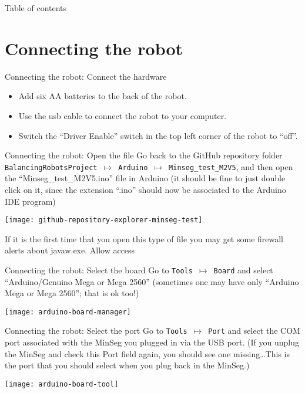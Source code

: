\begin{frame}{Table of contents}
	\tableofcontents
\end{frame}

\section{Connecting the robot}
\begin{frame}{Connecting the robot: Connect the hardware}
	\begin{itemize}
		\item Add six AA batteries to the back of the robot.
		\item Use the usb cable to connect the robot to your computer. 
		\item Switch the ``Driver Enable'' switch in the top left corner of the robot to ``off''.
		\end{itemize}
\end{frame}

\begin{frame}{Connecting the robot: Open the file}
	Go back to the GitHub repository folder \texttt{BalancingRobotsProject $\mapsto$ Arduino $\mapsto$ Minseg\_test\_M2V5}, and then open the ``Minseg\_test\_M2V5.ino'' file in Arduino (it should be fine to just double click on it, since the extension ``.ino'' should now be associated to the Arduino IDE program)
	\begin{center}
		\texttt{[image: github-repository-explorer-minseg-test]}
	\end{center}
	If it is the first time that you open this type of file you may get some firewall alerts about javaw.exe. Allow access
\end{frame}


\begin{frame}{Connecting the robot: Select the board}
	Go to \texttt{Tools $\mapsto$ Board} and select ``Arduino/Genuino Mega or Mega 2560'' (sometimes one may have only ``Arduino Mega or Mega 2560''; that is ok too!)
	\begin{center}
		\texttt{[image: arduino-board-manager]}
	\end{center}
\end{frame}


\begin{frame}{Connecting the robot: Select the port}
	Go to \texttt{Tools $\mapsto$ Port} and select the COM port associated with the MinSeg you plugged in via the USB port. (If you unplug the MinSeg and check this Port field again, you should see one missing\ldots This is the port that you should select when you plug back in the MinSeg.)
	\begin{center}
		\texttt{[image: arduino-board-tool]}
	\end{center}
\end{frame}

